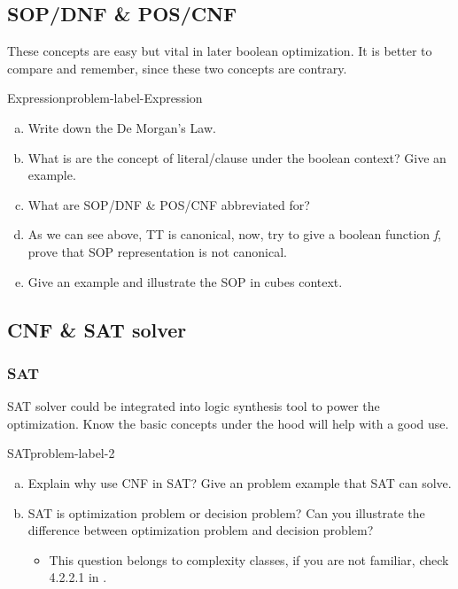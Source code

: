 \documentclass[main.tex]{subfiles}
\begin{document}
\subsection{SOP/DNF \& POS/CNF}
These concepts are easy but vital in later boolean optimization. It is better to compare and remember, since these two concepts are contrary.
\begin{problem}{Expression}{problem-label-Expression}
\begin{enumerate}[(a)]
    \item Write down the De Morgan’s Law.
    \item What is are the concept of literal/clause under the boolean context? Give an example.
    \item What are SOP/DNF \& POS/CNF abbreviated for?
    \item As we can see above, TT is canonical, now, try to give a boolean function \textit{f}, prove that SOP representation is not canonical.
    \item Give an example and illustrate the SOP in cubes context.
\end{enumerate}
\end{problem}
\vspace*{4\baselineskip}

\subsection{CNF \& SAT solver}
\subsubsection{SAT}
SAT solver could be integrated into logic synthesis tool to power the optimization. Know the basic concepts under the hood will help with a good use.
\begin{problem}{SAT}{problem-label-2}
\begin{enumerate}[(a)]
    \item Explain why use CNF in SAT? Give an problem example that SAT can solve.
    \item SAT is optimization problem or decision problem? Can you illustrate the difference between optimization problem and decision problem?
    \begin{itemize}
        \item This question belongs to complexity classes, if you are not familiar, check 4.2.2.1 in \cite{EDA2009}.
    \end{itemize} 
\end{enumerate}
\end{problem}
\vspace*{4\baselineskip}
\end{document}

